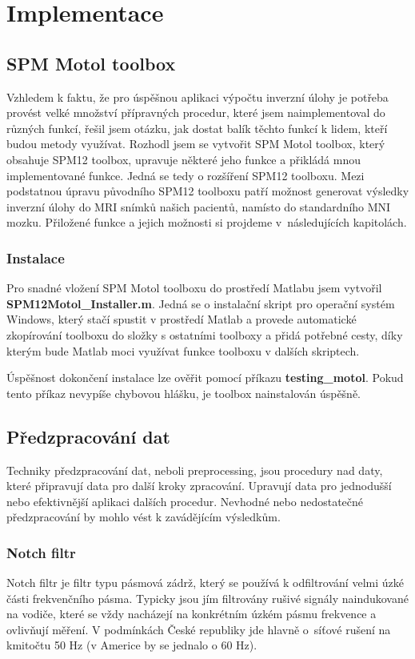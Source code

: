 
\chapter{Implementace}

\section{SPM Motol toolbox}
Vzhledem k faktu, že pro úspěšnou aplikaci výpočtu inverzní úlohy je potřeba provést velké množství přípravných procedur, které jsem naimplementoval do různých funkcí, řešil jsem otázku, jak dostat balík těchto funkcí k lidem, kteří budou metody využívat. Rozhodl jsem se vytvořit SPM Motol toolbox, který obsahuje SPM12 toolbox, upravuje některé jeho funkce a přikládá mnou implementované funkce. Jedná se tedy o rozšíření SPM12 toolboxu. Mezi podstatnou úpravu původního SPM12 toolboxu patří možnost generovat výsledky inverzní úlohy do MRI snímků našich pacientů, namísto do standardního MNI mozku. Přiložené funkce a jejich možnosti si projdeme v~následujících kapitolách.


\subsection{Instalace}
Pro snadné vložení SPM Motol toolboxu do prostředí Matlabu jsem vytvořil \textbf{SPM12Motol\_Installer.m}. Jedná se o instalační skript pro operační systém Windows, který stačí spustit v prostředí Matlab a provede automatické zkopírování toolboxu do složky s ostatními toolboxy a přidá potřebné cesty, díky kterým bude Matlab moci využívat funkce toolboxu v dalších skriptech.

Úspěšnost dokončení instalace lze ověřit pomocí příkazu \textbf{testing\_motol}. Pokud tento příkaz nevypíše chybovou hlášku, je toolbox nainstalován úspěšně.



\section{Předzpracování dat}
Techniky předzpracování dat, neboli preprocessing, jsou procedury nad daty, které připravují data pro další kroky zpracování. Upravují data pro jednodušší nebo efektivnější aplikaci dalších procedur. Nevhodné nebo nedostatečné předzpracování by mohlo vést k zavádějícím výsledkům.

\subsection{Notch filtr}
Notch filtr je filtr typu pásmová zádrž, který se používá k odfiltrování velmi úzké části frekvenčního pásma. Typicky jsou jím filtrovány rušivé signály naindukované na vodiče, které se vždy nacházejí na konkrétním úzkém pásmu frekvence a ovlivňují měření. V podmínkách České republiky jde hlavně o~síťové rušení na kmitočtu 50 Hz (v Americe by se jednalo o 60 Hz).

